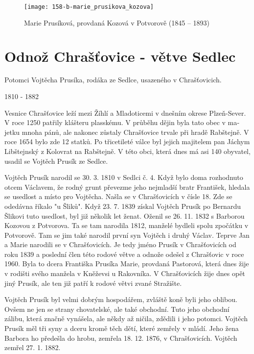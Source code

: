 \documentclass[../dejiny-rodu-prusiku.tex]{subfiles}
\begin{document}
\begin{figure}
\centering
\texttt{[image: 158-b-marie\_prusikova\_kozova]}
\caption{Marie Prusíková, provdaná Kozová v Potvorově (1845 – 1893)}
\label{fig:158-b-marie_prusikova_kozova}
\end{figure}

\section{Odnož Chrašťovice - větve Sedlec}

Potomci Vojtěcha Prusíka, rodáka ze Sedlce, usazeného v Chrašťovicich.

1810 - 1882

Vesnice Chrašťovice leží mezi Žíhlí a Mladoticemi v dnešním okrese Plzeň-Sever. V roce 1250 patřily kláš­teru plasskému. V průběhu dějin byla tato obec v ma­jetku mnoha pánů, ale nakonec zůstaly Chrašťovice trvale při hradě Rabštejně. V roce 1654 bylo zde 12 statků. Po třicetileté válce byl jejich majitelem pan Jáchym Libštejnský z Kolovrat na Rabštejně. V této obci, kte­rá dnes má asi 140 obyvatel, usadil se Vojtěch Prusík ze Sedlce.

Vojtěch Prusík narodil se 30. 3. 1810 v Sedlci č. 4. Když bylo doma rozhodnuto otcem Václavem, že rodný grunt převezme jeho nejmladší bratr František, hledala se usedlost a místo pro Vojtěcha. Našla se v Chrašťovicích v čísle 18. Zde se odedávna říkalo "u Šliků". Když 23. 7. 1839 získal Vojtěch Prusík po Bernardu Šlikovi tuto usedlost, byl již několik let ženat. Oženil se 26. 11. 1832 s Barborou Kozovou z Potvorova. Ta se tam narodila 1812, manželé bydleli spolu zpočátku v Potvorově. Tam se jim také narodil první syn Vojtěch i druhý Václav. Teprve Jan a Marie narodili se v Chrašťovicích. Je tedy jméno Prusík v Chrašťovicích od roku 1839 a poslední člen této rodové větve a odnože odešel z Chrašťovic v roce 1960. Byla to dcera Františka Prusíka Marie, provdaná Pastorová, která dnes žije v rodišti svého manže­la v Kněževsi u Rakovníka. V Chrašťovicích žije dnes opět jiný Prusík, ale ten již patří k rodové větvi zva­né Stražište.

Vojtěch Prusík byl velmi dobrým hospodářem, zvláště ko­ně byli jeho oblibou. Ovšem ne jen se strany chovatelské, ale také obchodní. Tuto jeho obchodní zálibu, která značně vynášela, ale někdy až ničila, zdědili i jeho potomci. Vojtěch Prusík měl tři syny a dceru kromě těch dětí, které zemřely v mládí. Jeho žena Barbora ho předešla do hrobu, zemřela 18. 12. 1876, v Chrašťovicích. Vojtěch zemřel 27. 1. 1882.
\end{document}
